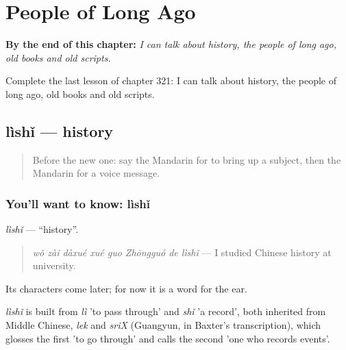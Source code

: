 
\chapter{People of Long Ago}
\label{ch:zh-people-of-long-ago}

\begin{chapteropening}
\textbf{By the end of this chapter:} \emph{I can talk about history, the people of long ago, old books and old scripts.}

Complete the last lesson of chapter 321: I can talk about history, the people of long ago, old books and old scripts.
\end{chapteropening}

\section[lìshǐ]{lìshǐ — history}

\label{lesson:ZH-C321-lishi}



\begin{quote}
Before the new one: say the Mandarin for to bring up a subject, then the Mandarin for a voice message.
\end{quote}

\subsection*{You'll want to know: lìshǐ}
\emph{lìshǐ} — \textquotedblleft{}history\textquotedblright{}.

\begin{quote}
\emph{wǒ zài dàxué xué guo Zhōngguó de lìshǐ} — I studied Chinese history at university.
\end{quote}

Its characters come later; for now it is a word for the ear.

\begin{cousinweb}
\emph{lìshǐ} is built from \emph{lì} 'to pass through' and \emph{shǐ} 'a record', both inherited from Middle Chinese, \emph{lek} and \emph{sriX} (Guangyun, in Baxter's transcription), which glosses the first 'to go through' and calls the second 'one who records events'.
\end{cousinweb}

